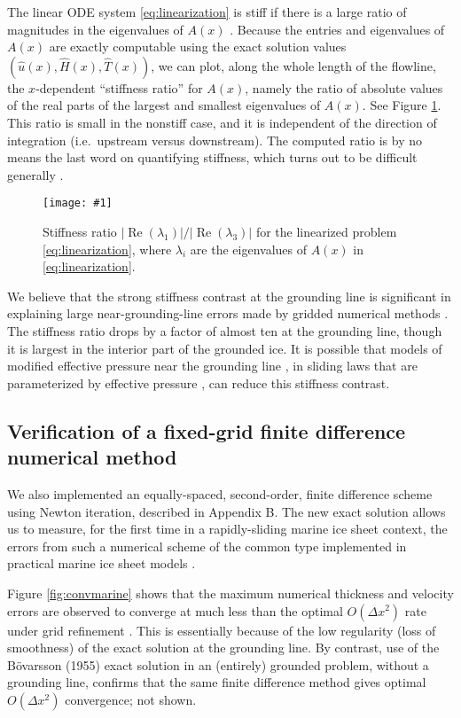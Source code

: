 \documentclass[review,letterpaper]{igs}
\renewcommand{\dh}{\fontencoding{T1}\selectfont{\symbol{240}}}
\newcommand{\onecol}[1]{\texttt{[image: \#1]}}
\newcommand{\citebod}{B\"o\dh varsson (1955)\nocite{Bodvardsson}\xspace}
\newcommand{\hu}{\hat u}
\newcommand{\hH}{\hat H}
\newcommand{\hT}{\hat T}
\begin{document}
The linear ODE system \eqref{eq:linearization} is stiff if there is a large ratio of magnitudes in the eigenvalues of $A(x)$ \citep{Pressetal}.  Because the entries and eigenvalues of $A(x)$ are exactly computable using the exact solution values $(\hu(x),\hH(x),\hT(x))$, we can plot, along the whole length of the flowline, the $x$-dependent ``stiffness ratio'' for $A(x)$, namely the ratio of absolute values of the real parts of the largest and smallest eigenvalues of $A(x)$.  See Figure \ref{fig:stiffness}.  This ratio is small in the nonstiff case, and it is independent of the direction of integration (i.e.~upstream versus downstream).  The computed ratio is by no means the last word on quantifying stiffness, which turns out to be difficult generally \citep[e.g.][]{HighamTrefethen1993}.

\begin{figure}[ht]
\onecol{em-stiffness-ratio}
\caption{Stiffness ratio $|\operatorname{Re}(\lambda_1)|/|\operatorname{Re}(\lambda_3)|$ for the linearized problem \eqref{eq:linearization}, where $\lambda_i$ are the eigenvalues of $A(x)$ in \eqref{eq:linearization}.} \label{fig:stiffness}
\end{figure}

We believe that the strong stiffness contrast at the grounding line is significant in explaining large near-grounding-line errors made by gridded numerical methods \citep{Gladstoneetal2010,MISMIP2012}.  The stiffness ratio drops by a factor of almost ten at the grounding line, though it is largest in the interior part of the grounded ice.  It is possible that models of modified effective pressure near the grounding line \citep{Leguyetal2014TCD}, in sliding laws that are parameterized by effective pressure \citep{Schoof2005cavitation}, can reduce this stiffness contrast.

\subsection*{Verification of a fixed-grid finite difference numerical method}  We also implemented an equally-spaced, second-order, finite difference scheme using Newton iteration, described in Appendix B.  The new exact solution allows us to measure, for the first time in a rapidly-sliding marine ice sheet context, the errors from such a numerical scheme of the common type implemented in practical marine ice sheet models \citep[e.g.][]{PollardDeConto2009WAIS,Winkelmannetal2011}.

Figure \ref{fig:convmarine} shows that the maximum numerical thickness and velocity errors are observed to converge at much less than the optimal $O(\Delta x^2)$ rate under grid refinement \citep{MortonMayers}.  This is essentially because of the low regularity (loss of smoothness) of the exact solution at the grounding line.  By contrast, use of the \citebod exact solution in an (entirely) grounded problem, without a grounding line, confirms that the same finite difference method gives optimal $O(\Delta x^2)$ convergence; not shown.
\end{document}
